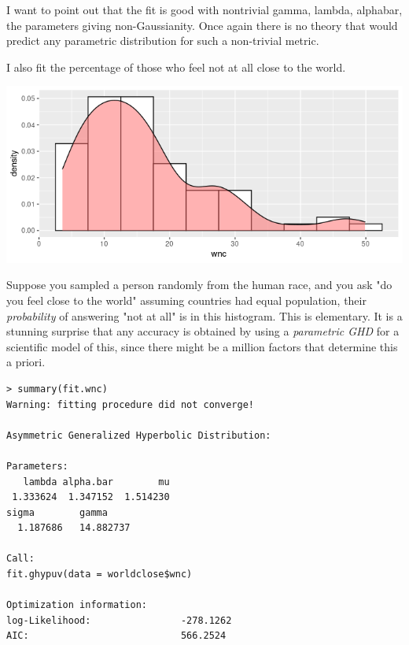 \documentclass{amsart}
\begin{document}
I want to point out that the fit is good with nontrivial gamma, lambda, alphabar, the parameters giving non-Gaussianity.  Once again there is no theory that would predict any parametric distribution for such a non-trivial metric.


I also fit the percentage of those who feel not at all close to the world.   

\includegraphics[scale=0.7]{worldnotclose.png}

Suppose you sampled a person randomly from the human race, and you ask "do you feel close to the world" assuming countries had equal population, their {\em probability} of answering "not at all" is in this histogram.  This is elementary.  It is a stunning surprise that any accuracy is obtained by using a {\em parametric GHD} for a scientific model of this, since there might be a million factors that determine this a priori.

\begin{verbatim}
> summary(fit.wnc)
Warning: fitting procedure did not converge!

Asymmetric Generalized Hyperbolic Distribution:

Parameters:
   lambda alpha.bar        mu
 1.333624  1.347152  1.514230 
sigma        gamma 
  1.187686   14.882737 

Call:
fit.ghypuv(data = worldclose$wnc)

Optimization information:
log-Likelihood:                -278.1262 
AIC:                           566.2524 
\end{verbatim}
\end{document}

